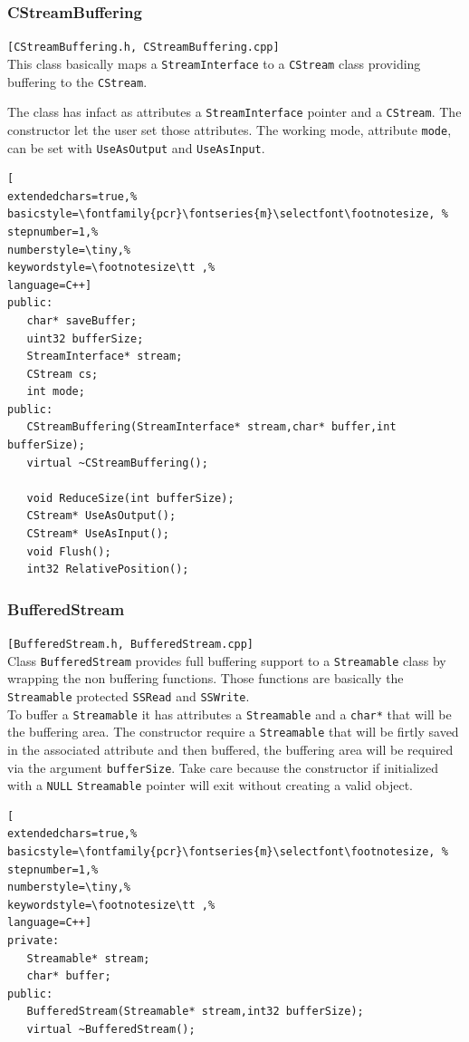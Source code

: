 \subsubsection{CStreamBuffering}
\texttt{[CStreamBuffering.h, CStreamBuffering.cpp]}\\
This class basically maps a \texttt{StreamInterface} to a \texttt{CStream} class providing buffering to the \texttt{CStream}.

The class has infact as attributes a \texttt{StreamInterface} pointer and a \texttt{CStream}. The constructor let the user set those attributes. The working mode, attribute \texttt{mode}, can be set with \texttt{UseAsOutput} and \texttt{UseAsInput}.
\begin{lstlisting}[
extendedchars=true,%
basicstyle=\fontfamily{pcr}\fontseries{m}\selectfont\footnotesize, %
stepnumber=1,%
numberstyle=\tiny,%
keywordstyle=\footnotesize\tt ,%
language=C++]
public:
   char* saveBuffer;
   uint32 bufferSize;
   StreamInterface* stream;
   CStream cs;
   int mode;
public:
   CStreamBuffering(StreamInterface* stream,char* buffer,int bufferSize);
   virtual ~CStreamBuffering();

   void ReduceSize(int bufferSize);
   CStream* UseAsOutput();
   CStream* UseAsInput();
   void Flush();
   int32 RelativePosition();
\end{lstlisting}



\subsubsection{BufferedStream}
\texttt{[BufferedStream.h, BufferedStream.cpp]}\\
Class \texttt{BufferedStream} provides full buffering support to a \texttt{Streamable} class by wrapping the non buffering functions. Those functions are basically the \texttt{Streamable} protected \texttt{SSRead} and \texttt{SSWrite}.\\


To buffer a \texttt{Streamable} it has attributes a \texttt{Streamable} and a \texttt{char*} that will be the buffering area. The constructor require a \texttt{Streamable} that will be firtly saved in the associated attribute and then buffered, the buffering area will be required via the argument \texttt{bufferSize}. Take care because the constructor if initialized with a \texttt{NULL} \texttt{Streamable} pointer will exit without creating a valid object.

\begin{lstlisting}[
extendedchars=true,%
basicstyle=\fontfamily{pcr}\fontseries{m}\selectfont\footnotesize, %
stepnumber=1,%
numberstyle=\tiny,%
keywordstyle=\footnotesize\tt ,%
language=C++]
private:
   Streamable* stream;
   char* buffer;
public:
   BufferedStream(Streamable* stream,int32 bufferSize);
   virtual ~BufferedStream();
\end{lstlisting}

